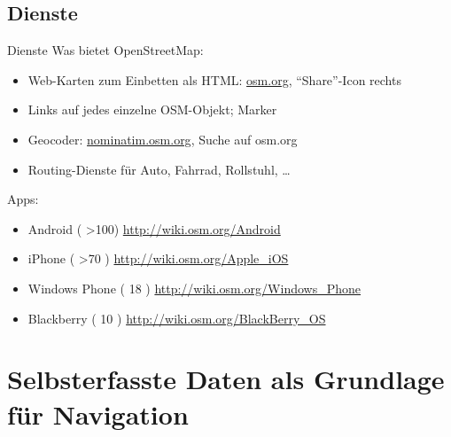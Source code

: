 \documentclass{beamer}
\begin{document}
\subsection{Dienste}

\begin{frame}{Dienste}
	Was bietet OpenStreetMap:
\begin{itemize}
	\item Web-Karten zum Einbetten als HTML: \href{http://osm.org}{osm.org}, "`Share"'-Icon rechts
		\pause
	\item Links auf jedes einzelne OSM-Objekt; Marker
		\pause
	\item Geocoder: \href{http://nominatim.osm.org}{nominatim.osm.org}, Suche auf osm.org
		\pause
	\item Routing-Dienste für Auto, Fahrrad, Rollstuhl, \dots
\end{itemize}

\pause
Apps:
\begin{itemize}
   \item  Android ( \textgreater 100) \url{http://wiki.osm.org/Android}
   \item  iPhone ( \textgreater 70 )  \url{http://wiki.osm.org/Apple\_iOS}
   \item  Windows Phone ( 18 ) \url{http://wiki.osm.org/Windows\_Phone}
   \item  Blackberry ( 10 ) \url{http://wiki.osm.org/BlackBerry\_OS}
 \end{itemize}

\end{frame}

\section{Selbsterfasste Daten als Grundlage für Navigation}
\end{document}
